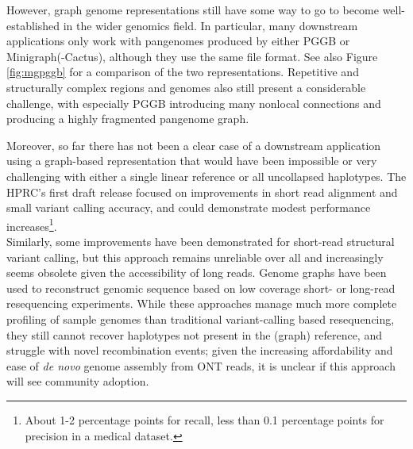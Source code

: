 
However, graph genome representations still have some way to go to become well-established in the wider genomics field.
In particular, many downstream applications only work with pangenomes produced by either PGGB or Minigraph(-Cactus), although they use the same file format.
See also Figure \ref{fig:mgpggb} for a comparison of the two representations. 
Repetitive and structurally complex regions and genomes also still present a considerable challenge, with especially PGGB introducing many nonlocal connections and producing a highly fragmented pangenome graph\cite{cheng25}.

Moreover, so far there has not been a clear case of a downstream application using a graph-based representation that would have been impossible or very challenging with either a single linear reference or all uncollapsed haplotypes.
The HPRC's first draft release focused on improvements in short read alignment and small variant calling accuracy, and could demonstrate modest performance increases\footnote{About 1-2 percentage points for recall, less than 0.1 percentage points for precision in a medical dataset.}\cite{liao23}.\\
Similarly, some improvements have been demonstrated for short-read structural variant calling, but this approach remains unreliable over all and increasingly seems obsolete given the accessibility of long reads\cite{hickey20}.
Genome graphs have been used to reconstruct genomic sequence based on low coverage short- or long-read resequencing experiments\cite{sun25, siren24, wang26}.
While these approaches manage much more complete profiling of sample genomes than traditional variant-calling based resequencing, they still cannot recover haplotypes not present in the (graph) reference, and struggle with novel recombination events; given the increasing affordability and ease of \textit{de novo} genome assembly from ONT reads, it is unclear if this approach will see community adoption.

